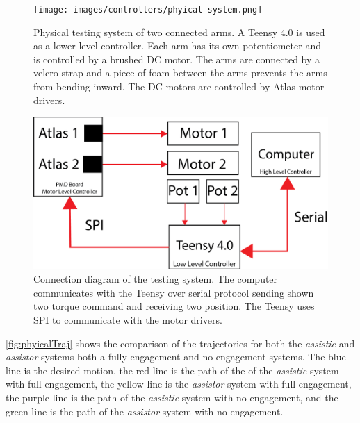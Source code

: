 \begin{figure}[h!]
    \centering
    \texttt{[image: images/controllers/phyical system.png]}
    \caption[Physical A-SMC Testing System]{Physical testing system of two connected arms. A Teensy 4.0 is used as a lower-level controller. Each arm has its own potentiometer and is controlled by a brushed DC motor. The arms are connected by a velcro strap and a piece of foam between the arms prevents the arms from bending inward. The DC motors are controlled by Atlas motor drivers. }
    \label{fig:phyicalTestingSystem}
\end{figure}


\begin{figure}
    \centering
    \includegraphics[width=\linewidth]{images/controllers/testing_system_diagam.png}
    \caption[Testing A-SMC System Diagram]{Connection diagram of the testing system. The computer communicates with the Teensy over serial protocol sending shown two torque command and receiving two position. The Teensy uses SPI to communicate with the motor drivers. }
    \label{fig:phyicalTestingDiagram}
\end{figure}


\autoref{fig:phyicalTraj} shows the comparison of the trajectories for both the \textit{assistie} and \textit{assistor} systems both a fully engagement and no engagement systems. The blue line is the desired motion, the red line is the path of the of the \textit{assistie} system with full engagement, the yellow line is the \textit{assistor} system with full engagement, the purple line is the path of the \textit{assistie} system with no engagement, and the green line is the path of the \textit{assistor} system with no engagement. 

